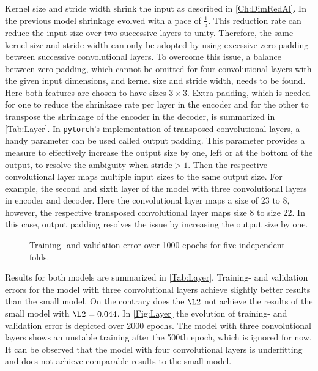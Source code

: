 Kernel size and stride width shrink the input as described in \cref{Ch:DimRedAl}. In the previous model shrinkage evolved with a pace of \(\frac{1}{5}\). This reduction rate can reduce the input size over two successive layers to unity. Therefore, the same kernel size and stride width can only be adopted by using excessive zero padding between successive convolutional layers. To overcome this issue, a balance between zero padding, which cannot be omitted for four convolutional layers with the given input dimensions, and kernel size and stride width, needs to be found. Here both features are chosen to have sizes \(3\times 3\). Extra padding, which is needed for one to reduce the shrinkage rate per layer in the encoder and for the other to transpose the shrinkage of the encoder in the decoder, is summarized in \cref{Tab:Layer}. In \texttt{pytorch}'s implementation of transposed convolutional layers, a handy parameter can be used called output padding. This parameter provides a measure to effectively increase the output size by one, left or at the bottom of the output, to resolve the ambiguity when \(\text{stride}>1\). Then the respective convolutional layer maps multiple input sizes to the same output size. For example, the second and sixth layer of the model with three convolutional layers in encoder and decoder. Here the convolutional layer maps a size of 23 to 8, however, the respective transposed convolutional layer maps size 8 to size 22. In this case, output padding resolves the issue by increasing the output size by one.         
\begin{center}
	\begin{figure}[htbp!]
		
		\label{Fig:kFold}
		\caption{Training- and validation error over 1000 epochs for five independent folds.}
	\end{figure}
\end{center}
Results for both models are summarized in \cref{Tab:Layer}. Training- and validation errors for the model with three convolutional layers achieve slightly better results than the small model. On the contrary does the \(\L2\) not achieve the results of the small model with \(\L2=0.044\). In \cref{Fig:Layer} the evolution of training- and validation error is depicted over 2000 epochs. The model with three convolutional layers shows an unstable training after the 500th epoch, which is ignored for now. It can be observed that the model with four convolutional layers is underfitting and does not achieve comparable results to the small model.  
